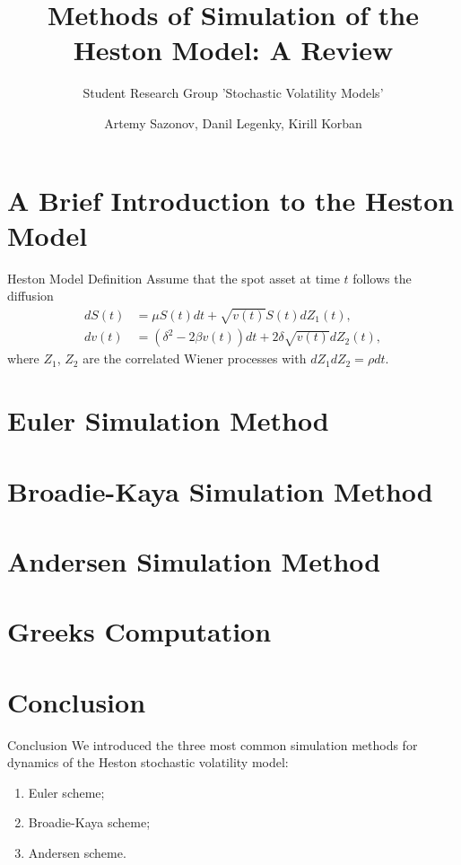 \documentclass{vegapresentation}
\subtitle{Student Research Group 'Stochastic Volatility Models'}
\title{Methods of Simulation of the Heston Model: A Review}
\author{Artemy Sazonov, Danil Legenky, Kirill Korban}
\institute{Lomonosov Moscow State Univesity, Faculty of Mechanics and Mathematics}
\begin{document}
    \begin{frame}
        \maketitle
    \end{frame}

    \section{A Brief Introduction to the Heston Model}
        \begin{frame}{Heston Model Definition}
            Assume that the spot asset at time $t$ follows the diffusion
            \begin{align}
                dS(t) & = \mu S(t)dt + \sqrt{v(t)} S(t) dZ_1(t), \label{Heston:price}\\
                dv(t) & = \left(\delta^2 - 2\beta v(t)\right) dt + 2\delta \sqrt{v(t)} dZ_2(t), \label{Heston:variance}
            \end{align}
            where $Z_1$, $Z_2$ are the correlated Wiener processes with $dZ_1dZ_2 = \rho dt$.
        \end{frame}

    \section{Euler Simulation Method}
        

    \section{Broadie-Kaya Simulation Method} 
        

    \section{Andersen Simulation Method}
        

    \section{Greeks Computation}
    
    \section{Conclusion}
        \begin{frame}{Conclusion}
            We introduced the three most common simulation methods for dynamics of the Heston stochastic volatility model:
            \begin{enumerate}
                \item Euler scheme; \\
                \item Broadie-Kaya scheme; \\
                \item Andersen scheme.
            \end{enumerate}
        \end{frame}
\end{document}
